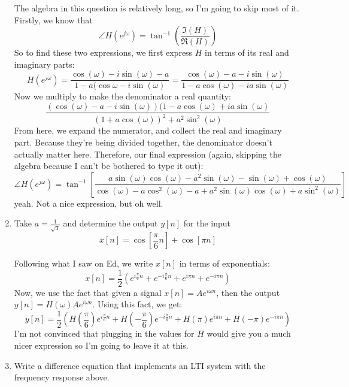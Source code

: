 \documentclass[10pt]{article}
\begin{document}
\begin{enumerate}[label=\alph*)]
			\begin{solution}
				The algebra in this question is relatively long, so I'm going to skip most of it. Firstly, we
				 know that
				 \[
				 \angle H(e^{j \omega}) = \tan^{-1}\left( \frac{\Im(H)}{\Re(H)} \right) 
				 \] 
				 So to find these two expressions, we first express \( H \) in terms of its real and 
				 imaginary parts:
				 \[
				 H(e^{j \omega}) = \frac{\cos(\omega) - i \sin(\omega) - a}{1 - a(\cos \omega - i \sin(\omega)}
				 = \frac{\cos(\omega) - a - i \sin(\omega)}{1 - a \cos(\omega) - ia \sin(\omega)}
				 \] 
				 Now we multiply to make the denominator a real quantity:
				 \[
				 \frac{(\cos (\omega) - a - i \sin(\omega))(1 - a\cos(\omega) + ia \sin(\omega)}{(1 + a \cos(\omega))^2
				 + a^2 \sin^2 (\omega)}
				 \] 
				 From here, we expand the numerator, and collect the real and imaginary part. Because they're being 
				 divided together, the denominator doesn't actually matter here. Therefore, our 
				 final expression (again, skipping the algebra because I can't be bothered to type 
				 it out): 
				 \[
				 \angle H(e^{j \omega}) = \tan^{-1}\left[ \frac{a \sin (\omega) \cos (\omega) - a^2\sin(\omega)
				 - \sin(\omega) + \cos(\omega)}{\cos(\omega) - a \cos^2(\omega) - a + a^2\sin(\omega) 
			 \cos(\omega) + a \sin^2(\omega)} \right] 
				 \] 
				 yeah. Not a nice expression, but oh well. 
			\end{solution}
		\item Take \( a = \frac{1}{\sqrt{3} } \) and determine the output \( y[n] \) for the input
			\[
				x[n] = \cos\left[ \frac{\pi}{6}n \right]  + \cos[\pi n]
			\] 

			\begin{solution}
				Following what I saw on Ed, we write \( x[n] \) in terms of exponentials:
				\[
					x[n] = \frac{1}{2}(e^{i \frac{\pi}{6}n} + e^{- i \frac{\pi}{6}n} + e^{i \pi n } + e^{- i \pi n})
				\] 
				Now, we use the fact that given a signal \( x[n] = Ae^{i \omega n} \), then the output 
				\( y[n] = H(\omega) Ae^{i \omega n} \). Using this fact, we get:
				\[
					y[n] = \frac{1}{2}\left( H\left( \frac{\pi}{6} \right) e^{i \frac{\pi}{6}n}
					+ H\left( -\frac{\pi}{6} \right) e^{- i \frac{\pi}{6}n} + H(\pi) e^{i \pi n} + 
				H(-\pi) e^{-i \pi n}\right) 
				\] 
				I'm not convinced that plugging in the values for \( H \) would give you a much nicer 
				expression so I'm going to leave it at this.
			\end{solution}
		\item Write a difference equation that implements an LTI system with the frequency response 
			above. 


\end{enumerate}
\end{document}
